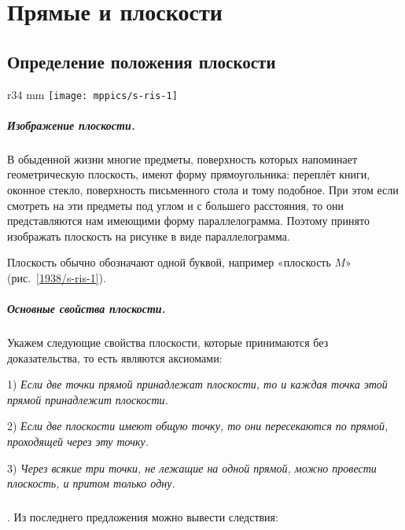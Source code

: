 \chapter{Прямые и плоскости}

\section{Определение положения плоскости}

\begin{wrapfigure}{r}{34 mm}
\centering
\texttt{[image: mppics/s-ris-1]}
\caption{}\label{1938/s-ris-1}
\end{wrapfigure}

\paragraph{Изображение плоскости.}\label{1938/s2}
В обыденной жизни многие предметы, поверхность которых напоминает геометрическую плоскость, имеют форму прямоугольника: переплёт книги, оконное стекло, поверхность письменного стола и тому подобное.
При этом если смотреть на эти предметы под углом и с большего расстояния, то они представляются нам имеющими форму параллелограмма.
Поэтому принято изображать плоскость на рисунке в виде параллелограмма.

Плоскость обычно обозначают одной буквой, например «плоскость $M$» (рис.~\ref{1938/s-ris-1}).

\paragraph{Основные свойства плоскости.}\label{1938/s3}
Укажем следующие свойства плоскости, которые принимаются без доказательства, то есть являются аксиомами:

1) \emph{Если две точки прямой принадлежат плоскости, то и каждая точка этой прямой принадлежит плоскости.}

2) \emph{Если две плоскости имеют общую точку, то они пересекаются по прямой, проходящей через эту точку.}

3) \emph{Через всякие три точки, не лежащие на одной прямой, можно провести плоскость, и притом только одну.}


\paragraph{} \label{1938/s4}
. Из последнего предложения можно вывести следствия:

